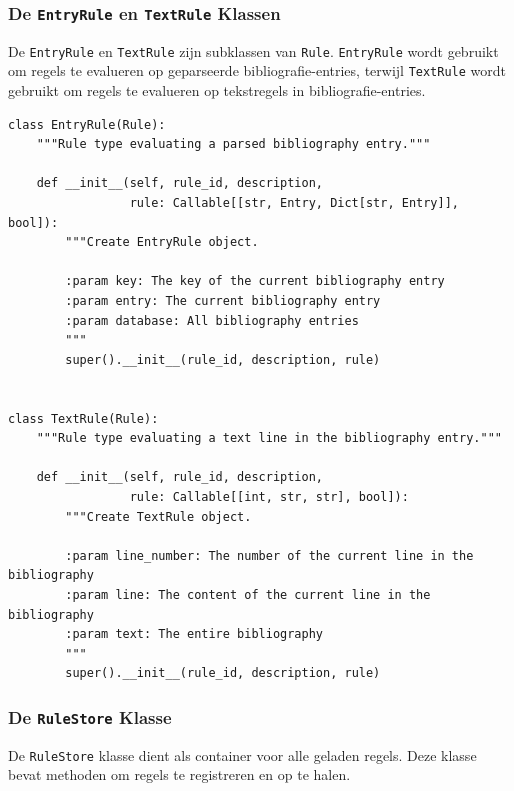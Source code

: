 \subsubsection{De \texttt{EntryRule} en \texttt{TextRule} Klassen}

De \texttt{EntryRule} en \texttt{TextRule} zijn subklassen van \texttt{Rule}. \texttt{EntryRule} wordt gebruikt om regels te evalueren op geparseerde bibliografie-entries, terwijl \texttt{TextRule} wordt gebruikt om regels te evalueren op tekstregels in bibliografie-entries.

\begin{verbatim}
class EntryRule(Rule):
    """Rule type evaluating a parsed bibliography entry."""

    def __init__(self, rule_id, description,
                 rule: Callable[[str, Entry, Dict[str, Entry]], bool]):
        """Create EntryRule object.

        :param key: The key of the current bibliography entry
        :param entry: The current bibliography entry
        :param database: All bibliography entries
        """
        super().__init__(rule_id, description, rule)


class TextRule(Rule):
    """Rule type evaluating a text line in the bibliography entry."""

    def __init__(self, rule_id, description,
                 rule: Callable[[int, str, str], bool]):
        """Create TextRule object.

        :param line_number: The number of the current line in the bibliography
        :param line: The content of the current line in the bibliography
        :param text: The entire bibliography
        """
        super().__init__(rule_id, description, rule)
\end{verbatim}

\subsubsection{De \texttt{RuleStore} Klasse}

De \texttt{RuleStore} klasse dient als container voor alle geladen regels. Deze klasse bevat methoden om regels te registreren en op te halen.

